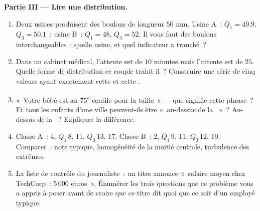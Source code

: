 \begin{problem}
\medskip
\noindent\textbf{Partie III --- Lire une distribution.}
\begin{enumerate}[resume]
  \item Deux usines produisent des boulons de longueur 
        $50$ mm. Usine A~: $Q_1 = 49.9$, $Q_3 = 50.1$~; usine B~:
        $Q_1 = 48$, $Q_3 = 52$. Il vous faut des boulons
        interchangeables~: quelle usine, et quel indicateur a
        tranché~?
  \item Dans un cabinet médical, l'attente  est de $10$
        minutes mais l'attente  est de $25$. Quelle forme de
        distribution ce couple trahit-il~? Construire une série de
        cinq valeurs ayant exactement cette  et cette
        .
  \item «~Votre bébé est au 75\textsuperscript{e} centile pour la
        taille~» --- que signifie cette phrase~? Et tous les
        enfants d'une ville peuvent-ils être «~au-dessus de la
        ~»~? Au-dessus de la ~? Expliquer la
        différence.
  \item Classe A~:  $4$, $Q_1\,8$,  $11$, $Q_3\,13$,
         $17$. Classe B~:  $2$, $Q_1\,9$, 
        $11$, $Q_3\,12$,  $19$. Comparer~: note typique,
        homogénéité de la moitié centrale, turbulence des extrêmes.
  \item La liste de contrôle du journaliste~: un titre annonce
        «~salaire moyen chez TechCorp~: $5\,000$ euros~». Énumérer
        les trois questions que ce problème vous a appris à poser
        avant de croire que ce titre dit quoi que ce soit d'un
        employé typique.
\end{enumerate}


\end{problem}
